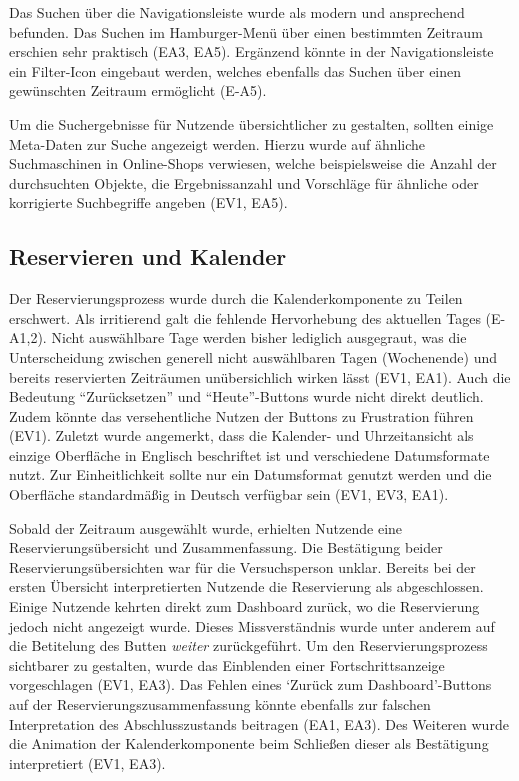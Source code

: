 Das Suchen über die Navigationsleiste wurde als modern und ansprechend befunden. Das Suchen im
Hamburger-Menü über einen bestimmten Zeitraum erschien sehr praktisch (EA3, EA5). Ergänzend könnte
in der Navigationsleiste ein Filter-Icon eingebaut werden, welches ebenfalls das Suchen über einen
gewünschten Zeitraum ermöglicht (E-A5).

Um die Suchergebnisse für Nutzende übersichtlicher zu gestalten, sollten einige Meta-Daten zur
Suche angezeigt werden. Hierzu wurde auf ähnliche Suchmaschinen in Online-Shops verwiesen, welche
beispielsweise die Anzahl der durchsuchten Objekte, die Ergebnissanzahl und Vorschläge für ähnliche
oder korrigierte Suchbegriffe angeben (EV1, EA5).

\subsection{Reservieren und Kalender}
Der Reservierungsprozess wurde durch die Kalenderkomponente zu Teilen erschwert. Als irritierend
galt die fehlende Hervorhebung des aktuellen Tages (E-A1,2). Nicht auswählbare Tage werden bisher
lediglich ausgegraut, was die Unterscheidung zwischen generell nicht auswählbaren Tagen (Wochenende)
und bereits reservierten Zeiträumen unübersichlich wirken lässt (EV1, EA1). Auch die Bedeutung
\enquote{Zurücksetzen} und \enquote{Heute}-Buttons wurde nicht direkt deutlich. Zudem könnte das
versehentliche Nutzen der Buttons zu Frustration führen (EV1). Zuletzt wurde angemerkt, dass die
Kalender- und Uhrzeitansicht als einzige Oberfläche in Englisch beschriftet ist und verschiedene
Datumsformate nutzt. Zur Einheitlichkeit sollte nur ein Datumsformat genutzt werden und die
Oberfläche standardmäßig in Deutsch verfügbar sein (EV1, EV3, EA1).

Sobald der Zeitraum ausgewählt wurde, erhielten Nutzende eine Reservierungsübersicht und
Zusammenfassung. Die Bestätigung beider Reservierungsübersichten war für die Versuchsperson unklar.
Bereits bei der ersten Übersicht interpretierten Nutzende die Reservierung als abgeschlossen. Einige
Nutzende kehrten direkt zum Dashboard zurück, wo die Reservierung jedoch nicht angezeigt wurde.
Dieses Missverständnis wurde unter anderem auf die Betitelung des Butten \textit{weiter}
zurückgeführt. Um den Reservierungsprozess sichtbarer zu gestalten, wurde das Einblenden einer
Fortschrittsanzeige vorgeschlagen (EV1, EA3). Das Fehlen eines \enquote*{Zurück zum Dashboard}-Buttons
auf der Reservierungszusammenfassung könnte ebenfalls zur falschen Interpretation des
Abschlusszustands beitragen (EA1, EA3). Des Weiteren wurde die Animation der Kalenderkomponente beim
Schließen dieser als Bestätigung interpretiert (EV1, EA3).

